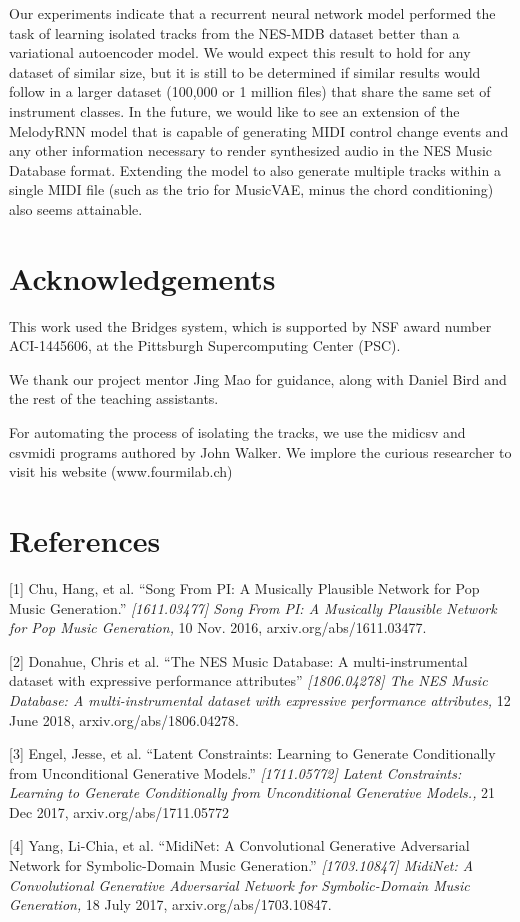 \documentclass{article}
\begin{document}
Our experiments indicate that a recurrent neural network model performed the task of learning isolated tracks from the NES-MDB dataset better than a variational autoencoder model. We would expect this result to hold for any dataset of similar size, but it is still to be determined if similar results would follow in a larger dataset (100,000 or 1 million files) that share the same set of instrument classes. In the future, we would like to see an extension of the MelodyRNN model that is capable of generating MIDI control change events and any other information necessary to render synthesized audio in the NES Music Database format. Extending the model to also generate multiple tracks within a single MIDI file (such as the trio for MusicVAE, minus the chord conditioning) also seems attainable.

\section{Acknowledgements}
This work used the Bridges system, which is supported by NSF award number ACI-1445606, at the Pittsburgh Supercomputing Center (PSC).

We thank our project mentor Jing Mao for guidance, along with Daniel Bird and the rest of the teaching assistants.

For automating the process of isolating the tracks, we use the midicsv and csvmidi programs authored by John Walker. We implore the curious researcher to visit his website (www.fourmilab.ch)

\section*{References}

\small

[1] Chu, Hang, et al. ``Song From PI: A Musically Plausible Network for Pop Music Generation.'' {\it [1611.03477] Song From PI: A Musically Plausible Network for Pop Music Generation,} 10 Nov. 2016, arxiv.org/abs/1611.03477.

[2] Donahue, Chris et al. ``The NES Music Database: A multi-instrumental dataset with expressive performance attributes'' {\it [1806.04278] The NES Music Database: A multi-instrumental dataset with expressive performance attributes,} 12 June 2018, arxiv.org/abs/1806.04278.

[3] Engel, Jesse, et al. ``Latent Constraints: Learning to Generate Conditionally from Unconditional Generative Models.'' {\it[1711.05772] Latent Constraints: Learning to Generate Conditionally from Unconditional Generative Models.,} 21 Dec 2017, arxiv.org/abs/1711.05772

[4] Yang, Li-Chia, et al. ``MidiNet: A Convolutional Generative Adversarial Network for Symbolic-Domain Music Generation.'' {\it[1703.10847] MidiNet: A Convolutional Generative Adversarial Network for Symbolic-Domain Music Generation,} 18 July 2017, arxiv.org/abs/1703.10847.
\end{document}
